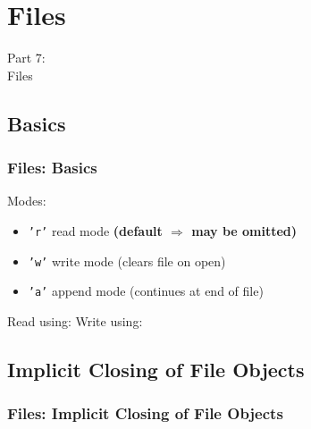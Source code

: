 
\section{Files}
\begin{frame}
    \vspace{25mm}
    \begin{center}
        \Huge{Part 7:\\Files}
    \end{center}
\end{frame}

\subsection{Basics}
\begin{frame}
    \frametitle{\textbf{Files:} Basics}
    \vspace{0mm}
    \contentFilesI
    \pause
    \vspace{3mm}
    Modes:
    \begin{itemize}
        \item \texttt{'r'} read mode \textbf{(default $\Rightarrow$ may be omitted)}
        \item \texttt{'w'} write mode (clears file on open)
        \item \texttt{'a'} append mode (continues at end of file)
    \end{itemize}
    \pause
    \vspace{3mm}
    Read using:
    \contentFilesIr
    \pause
    \vspace{3mm}
    Write using:
    \contentFilesIw
\end{frame}

\subsection{Implicit Closing of File Objects}
\begin{frame}
    \frametitle{\textbf{Files:} Implicit Closing of File Objects}
    \vspace{0mm}
    \contentFilesII
\end{frame}

